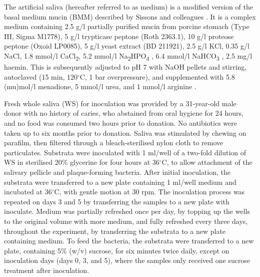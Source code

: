 \documentclass[10pt,a4paper]{article}
\begin{document}
The artificial saliva (hereafter referred to as medium) is a modified
version of the basal medium mucin (BMM) described by Sissons and
colleagues \citep{sissonsMultistationPlaque1991}. It is a complex
medium containing 2.5 g/l partially purified mucin from porcine stomach
(Type III, Sigma M1778), 5 g/l trypticase peptone (Roth 2363.1), 10 g/l
proteose peptone (Oxoid LP0085), 5 g/l yeast extract (BD 211921), 2.5
g/l KCl, 0.35 g/l NaCl, 1.8 mmol/l CaCl\textsubscript{2}, 5.2 mmol/l
Na\textsubscript{2}HPO\textsubscript{4}
\citep{sissonsMultistationPlaque1991}, 6.4 mmol/l NaHCO\textsubscript{3}
\citep{shellisSyntheticSaliva1978}, 2.5 mg/l haemin. This is
subsequently adjusted to pH 7 with NaOH pellets and stirring, autoclaved
(15 min, 120\(^{\circ}\)C, 1 bar overpressure), and supplemented with
5.8 (mu)mol/l menadione, 5 mmol/l urea, and 1 mmol/l arginine
\citep{sissonsMultistationPlaque1991}.

Fresh whole saliva (WS) for inoculation was provided by a 31-year-old
male donor with no history of caries, who abstained from oral hygiene
for 24 hours, and no food was consumed two hours prior to donation. No
antibiotics were taken up to six months prior to donation. Saliva was
stimulated by chewing on parafilm, then filtered through a
bleach-sterilised nylon cloth to remove particulates. Substrata were
inoculated with 1 ml/well of a two-fold dilution of WS in sterilised
20\% glycerine for four hours at 36\(^{\circ}\)C, to allow attachment of
the salivary pellicle and plaque-forming bacteria. After initial
inoculation, the substrata were transferred to a new plate containing 1
ml/well medium and incubated at 36\(^{\circ}\)C, with gentle motion at
30 rpm. The inoculation process was repeated on days 3 and 5 by
transferring the samples to a new plate with inoculate. Medium was
partially refreshed once per day, by topping up the wells to the
original volume with more medium, and fully refreshed every three days,
throughout the experiment, by transferring the substrata to a new plate
containing medium. To feed the bacteria, the substrata were transferred
to a new plate, containing 5\% (w/v) sucrose, for six minutes twice
daily, except on inoculation days (days 0, 3, and 5), where the samples
only received one sucrose treatment after inoculation.
\end{document}
